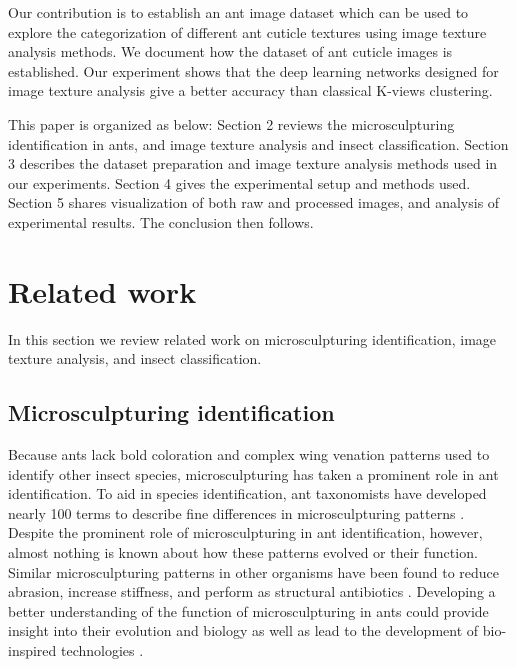 \documentclass{aci}
\numberwithin{equation}{section}
\begin{document}
Our contribution is to establish an ant image dataset which can be used to
explore the categorization of different ant cuticle textures using image texture
analysis methods. We document how the dataset of ant cuticle images is
established. Our experiment shows that the deep learning networks designed for
image texture analysis give a better accuracy than classical K-views clustering.

This paper is organized as below:  Section 2 reviews the microsculpturing
identification in ants, and image texture analysis and insect classification.
Section 3 describes the dataset preparation and image texture analysis methods
used in our experiments. Section 4 gives the experimental setup and methods
used. Section 5 shares visualization of both raw and processed images, and
analysis of experimental results. The conclusion then follows.

\section{Related work}

In this section we review related work on microsculpturing identification, image
texture analysis, and insect classification.

\subsection{Microsculpturing identification}

Because ants lack bold coloration and complex wing venation patterns used to
identify other insect species, microsculpturing has taken a prominent role in
ant identification. To aid in species identification, ant taxonomists have
developed nearly 100 terms to describe  fine differences in microsculpturing
patterns \cite{harris_glossary_1979, bolton_identification_1994}. Despite the
prominent role of microsculpturing in ant identification, however, almost
nothing is known about how these patterns evolved or their function. Similar
microsculpturing patterns in other organisms have been found to reduce abrasion,
increase stiffness, and perform as structural antibiotics
\cite{zhiwu_erosion_2012, han_efficient_2015, rees_form_1975,
    chung_impact_2007,hasan_selective_2013}. Developing a better understanding of
the function of microsculpturing in ants could provide insight into their
evolution and biology as well as lead to the development of bio-inspired
technologies \cite{penick_comparative_2022}.
\end{document}
